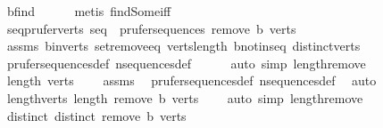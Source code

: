 \begin{isabellebody}
\ b{\isacharunderscore}{\kern0pt}find\isanewline
\ \ \ \ \isamarkupfalse%
\ {\isacharparenleft}{\kern0pt}metis\ find{\isacharunderscore}{\kern0pt}Some{\isacharunderscore}{\kern0pt}iff{\isacharparenright}{\kern0pt}\isanewline
\ \ \isamarkupfalse%
\ seq{\isacharunderscore}{\kern0pt}prufer{\isacharunderscore}{\kern0pt}verts{\isacharprime}{\kern0pt}{\isacharcolon}{\kern0pt}\ {\isachardoublequoteopen}seq\ {\isasymin}\ prufer{\isacharunderscore}{\kern0pt}sequences\ {\isacharparenleft}{\kern0pt}remove{}\ b\ verts{\isacharparenright}{\kern0pt}{\isachardoublequoteclose}\isanewline
\ \ \ \ \isamarkupfalse%
\ assms\ b{\isacharunderscore}{\kern0pt}in{\isacharunderscore}{\kern0pt}verts\ set{\isacharunderscore}{\kern0pt}remove{}{\isacharunderscore}{\kern0pt}eq\ verts{\isacharunderscore}{\kern0pt}length\ b{\isacharunderscore}{\kern0pt}not{\isacharunderscore}{\kern0pt}in{\isacharunderscore}{\kern0pt}seq\ distinct{\isacharunderscore}{\kern0pt}verts\isanewline
\ \ \ \ \isamarkupfalse%
\ prufer{\isacharunderscore}{\kern0pt}sequences{\isacharunderscore}{\kern0pt}def\ n{\isacharunderscore}{\kern0pt}sequences{\isacharunderscore}{\kern0pt}def\isanewline
\ \ \ \ \isamarkupfalse%
\ {\isacharparenleft}{\kern0pt}auto\ simp{\isacharcolon}{\kern0pt}\ length{\isacharunderscore}{\kern0pt}remove{}{\isacharparenright}{\kern0pt}\isanewline
\ \ \isamarkupfalse%
\ {\isachardoublequoteopen}length\ verts\ {\isasymge}\ {}{\isachardoublequoteclose}\ \isamarkupfalse%
\ assms\ \isamarkupfalse%
\ prufer{\isacharunderscore}{\kern0pt}sequences{\isacharunderscore}{\kern0pt}def\ n{\isacharunderscore}{\kern0pt}sequences{\isacharunderscore}{\kern0pt}def\ \isamarkupfalse%
\ auto\isanewline
\ \ \isamarkupfalse%
\ \isamarkupfalse%
\ length{\isacharunderscore}{\kern0pt}verts{\isacharprime}{\kern0pt}{\isacharcolon}{\kern0pt}\ {\isachardoublequoteopen}length\ {\isacharparenleft}{\kern0pt}remove{}\ b\ verts{\isacharparenright}{\kern0pt}\ {\isasymge}\ {}{\isachardoublequoteclose}\ \isamarkupfalse%
\ {\isacharparenleft}{\kern0pt}auto\ simp{\isacharcolon}{\kern0pt}\ length{\isacharunderscore}{\kern0pt}remove{}{\isacharparenright}{\kern0pt}\isanewline
\ \ \isamarkupfalse%
\ distinct{\isacharcolon}{\kern0pt}\ {\isachardoublequoteopen}distinct\ {\isacharparenleft}{\kern0pt}remove{}\ b\ verts{\isacharparenright}{\kern0pt}{\isachardoublequoteclose}\ \isamarkupfalse%

\end{isabellebody}
